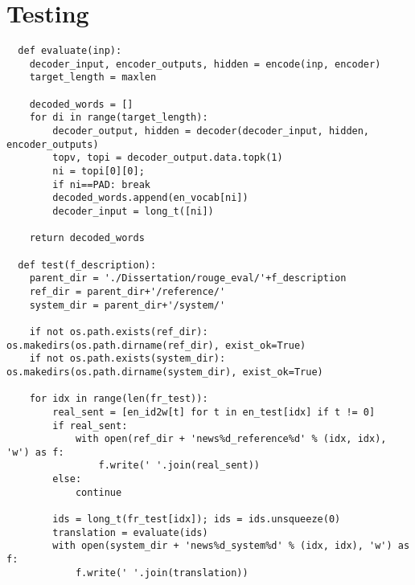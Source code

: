 \section{Testing}
\begin{lstlisting}
  def evaluate(inp):
    decoder_input, encoder_outputs, hidden = encode(inp, encoder)
    target_length = maxlen

    decoded_words = []
    for di in range(target_length):
        decoder_output, hidden = decoder(decoder_input, hidden, encoder_outputs)
        topv, topi = decoder_output.data.topk(1)
        ni = topi[0][0];
        if ni==PAD: break
        decoded_words.append(en_vocab[ni])
        decoder_input = long_t([ni])
    
    return decoded_words

  def test(f_description):
    parent_dir = './Dissertation/rouge_eval/'+f_description
    ref_dir = parent_dir+'/reference/'
    system_dir = parent_dir+'/system/'
    
    if not os.path.exists(ref_dir): os.makedirs(os.path.dirname(ref_dir), exist_ok=True)
    if not os.path.exists(system_dir): os.makedirs(os.path.dirname(system_dir), exist_ok=True)
    
    for idx in range(len(fr_test)):
        real_sent = [en_id2w[t] for t in en_test[idx] if t != 0]
        if real_sent:
            with open(ref_dir + 'news%d_reference%d' % (idx, idx), 'w') as f:
                f.write(' '.join(real_sent))
        else:
            continue

        ids = long_t(fr_test[idx]); ids = ids.unsqueeze(0)
        translation = evaluate(ids)
        with open(system_dir + 'news%d_system%d' % (idx, idx), 'w') as f:
            f.write(' '.join(translation))
\end{lstlisting}